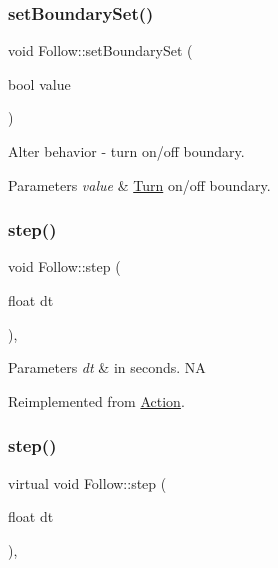 \subsubsection{\texorpdfstring{set\+Boundary\+Set()}{setBoundarySet()}\hspace{0.1cm}{\footnotesize\ttfamily [2/2]}}
{\footnotesize\ttfamily void Follow\+::set\+Boundary\+Set (\begin{DoxyParamCaption}\item[{bool}]{value }\end{DoxyParamCaption})\hspace{0.3cm}{\ttfamily [inline]}}

Alter behavior -\/ turn on/off boundary.


\begin{DoxyParams}{Parameters}
{\em value} & \hyperlink{classTurn}{Turn} on/off boundary. \\
\hline
\end{DoxyParams}
\mbox{\label{classFollow_a0f027ac080c352070a653d1dbb8f761d}} 
\subsubsection{\texorpdfstring{step()}{step()}\hspace{0.1cm}{\footnotesize\ttfamily [1/2]}}
{\footnotesize\ttfamily void Follow\+::step (\begin{DoxyParamCaption}\item[{float}]{dt }\end{DoxyParamCaption})\hspace{0.3cm}{\ttfamily [override]}, {\ttfamily [virtual]}}


\begin{DoxyParams}{Parameters}
{\em dt} & in seconds.  NA \\
\hline
\end{DoxyParams}


Reimplemented from \hyperlink{classAction_a9a64ee9e8e977672748f70893ebaff66}{Action}.

\mbox{\label{classFollow_a808fb0fab228b588de9642dc40bf9a14}} 
\subsubsection{\texorpdfstring{step()}{step()}\hspace{0.1cm}{\footnotesize\ttfamily [2/2]}}
{\footnotesize\ttfamily virtual void Follow\+::step (\begin{DoxyParamCaption}\item[{float}]{dt }\end{DoxyParamCaption})\hspace{0.3cm}{\ttfamily [override]}, {\ttfamily [virtual]}}


